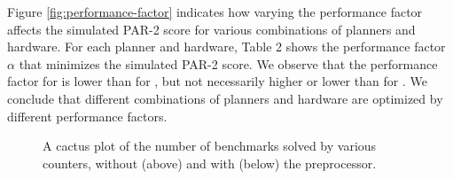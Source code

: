 Figure \ref{fig:performance-factor} indicates how varying the performance factor affects the simulated PAR-2 score for various combinations of planners and hardware. For each planner and hardware, Table 2 shows the performance factor $\alpha$ that minimizes the simulated PAR-2 score. We observe that the performance factor for  is lower than for , but not necessarily higher or lower than for . We conclude that different combinations of planners and hardware are optimized by different performance factors. %


\begin{figure}[tp]
\begin{center}

\vspace*{-0.9cm}
\caption{\label{fig:parallel:comparison} A cactus plot of the number of benchmarks solved by various counters, without (above) and with (below) the   preprocessor.}
\end{center}
\vspace*{-0.8cm}
\end{figure}

